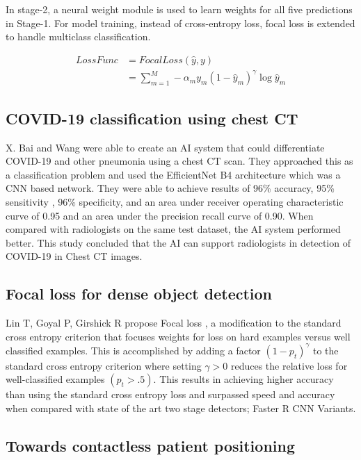 \documentclass{sigkddExp}
\begin{document}
In stage-2, a neural weight module is used to learn weights for all five
predictions in Stage-1. For model training, instead of cross-entropy loss, focal
loss is extended to handle multiclass classification.

\begin{align}
    LossFunc &=FocalLoss(\hat{y},y) \\
    &=\sum_{m=1}^{M} - \alpha_m y_m (1-\hat{y}_m)^\gamma \log{\hat{y}_m}
\end{align}

\subsection{COVID-19 classification using chest CT}

X. Bai and Wang \cite{pmid32339081} were able to create an AI system that could
differentiate COVID-19 and other pneumonia using a chest CT scan. They
approached this as a classification problem and used the EfficientNet B4
architecture which was a CNN based network. They were able to achieve results of
96\% accuracy, 95\% sensitivity , 96\% specificity, and an area under receiver
operating characteristic curve of 0.95 and an area under the precision recall
curve of 0.90. When compared with radiologists on the same test dataset, the AI
system performed better. This study concluded that the AI can support
radiologists in detection of COVID-19 in Chest CT images.

\subsection{Focal loss for dense object detection}

Lin T, Goyal P, Girshick R propose Focal loss \cite{lin2018focal}, a
modification to the standard cross entropy criterion that focuses weights for
loss on hard examples versus well classified examples. This is accomplished by
adding a factor $(1 - p_t)^\gamma$ to the standard cross entropy criterion where
setting $\gamma  > 0$ reduces the relative loss for well-classified examples
$(p_t > .5)$. This results in achieving higher accuracy than using the standard
cross entropy loss and surpassed speed and accuracy when compared with state of
the art two stage detectors; Faster R CNN Variants.


\subsection{Towards contactless patient positioning}
\end{document}
